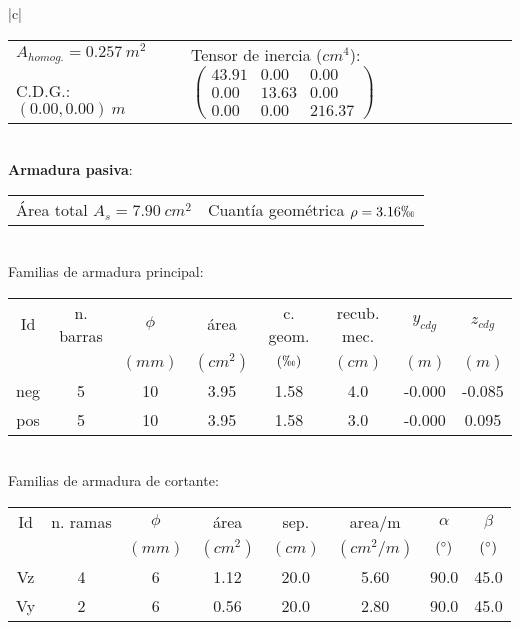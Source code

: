 \begin{center}
\begin{tabular}{|c|}
\hline
\begin{tabular}{ll}
$A_{homog.}= 0.257\ m^2$ & \multirow{3}{*}{Tensor de inercia ($cm^4$): $ \left( \begin{array}{ccc}43.91 & 0.00 & 0.00 \\ 0.00 & 13.63 &  0.00 \\ 0.00 &  0.00 & 216.37 \end{array} \right)$} \\
& \\
C.D.G.: $( 0.00, 0.00)\ m$  & \\
\end{tabular} \\
\hline
\textbf{Armadura pasiva}:\\
\hline
\begin{tabular}{ll}
Área total $A_s= 7.90\ cm^2$ & Cuantía geométrica $\rho= 3.16\permil$\\
\end{tabular} \\
\hline
Familias de armadura principal:\\
\hline
\begin{tabular}{cccccccc}
Id & n. barras & $\phi$ & área & c. geom. & recub. mec. & $y_{cdg}$ & $z_{cdg}$\\
 &  & $(mm)$ & $(cm^2)$ & $(\permil)$ & $(cm)$ & $(m)$ & $(m)$\\
\hline
neg & 5 & 10 &  3.95 & 1.58 &  4.0 & -0.000 & -0.085\\
\hline
pos & 5 & 10 &  3.95 & 1.58 &  3.0 & -0.000 & 0.095\\
\end{tabular} \\
\hline
Familias de armadura de cortante:\\
\hline
\begin{tabular}{cccccccc}
Id & n. ramas & $\phi$ & área & sep. & area/m & $\alpha$ & $\beta$\\
 &  & $(mm)$ & $(cm^2)$ & $(cm)$ & $(cm^2/m)$ & $( \degree)$ & $( \degree)$\\
\hline
Vz & 4 & 6 &  1.12 & 20.0 &  5.60 & 90.0 & 45.0\\
\hline
Vy & 2 & 6 &  0.56 & 20.0 &  2.80 & 90.0 & 45.0\\
\end{tabular} \\
\hline
\end{tabular}
\end{center}
